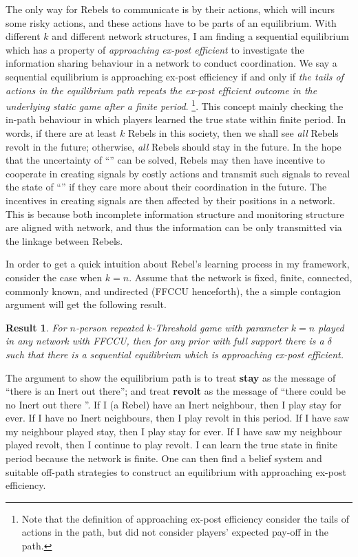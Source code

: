 \documentclass[12pt,letter]{article}
\newtheorem{result}{Result}
\theoremstyle{definition}
\theoremstyle{remark}
\theoremstyle{claim}
\begin{document}
The only way for Rebels to communicate is by their actions, which will incurs some risky actions, and these actions have to be parts of an equilibrium. With different $k$ and different network structures, I am finding a sequential equilibrium which has a property of \textit{approaching ex-post efficient} to investigate the information sharing behaviour in a network to conduct coordination. We say a sequential equilibrium is approaching ex-post efficiency if and only if \textit{the tails of actions in the equilibrium path repeats the ex-post efficient outcome in the underlying static game after a finite period}. \footnote{Note that the definition of approaching ex-post efficiency consider the tails of actions in the path, but did not consider players' expected pay-off in the path.}. This concept mainly checking the in-path behaviour in which players learned the true state within finite period. In words, if there are at least $k$ Rebels in this society, then we shall see \textit{all} Rebels revolt in the future; otherwise, \textit{all} Rebels should stay in the future. In the hope that the uncertainty of ``'' can be solved, Rebels may then have incentive to cooperate in creating signals by costly actions and transmit such signals to reveal the state of ``'' if they care more about their coordination in the future. The incentives in creating signals are then affected by their positions in a network. This is because both incomplete information structure and monitoring structure are aligned with network, and thus the information can be only transmitted via the linkage between Rebels. 

In order to get a quick intuition about Rebel's learning process in my framework, consider the case when $k=n$. Assume that the network is fixed, finite, connected, commonly known, and undirected (FFCCU henceforth), the a simple contagion argument will get the following result.
\begin{result}
For $n$-person repeated $k$-Threshold game with parameter $k=n$ played in any network with FFCCU, then for any prior with full support there is a $\delta$ such that there is a sequential equilibrium which is approaching ex-post efficient.
\end{result}

The argument to show the equilibrium path is to treat \textbf{stay} as the message of ``there is an Inert out there''; and treat \textbf{revolt} as the message of ``there could be no Inert out there ''. If I (a Rebel) have an Inert neighbour, then I play stay for ever. If I have no Inert neighbours, then I play revolt in this period. If I have saw my neighbour played stay, then I play stay for ever. If I have saw my neighbour played revolt, then I continue to play revolt. I can learn the true state in finite period because the network is finite. One can then find a belief system and suitable off-path strategies to construct an equilibrium with approaching ex-post efficiency. 
\end{document}

